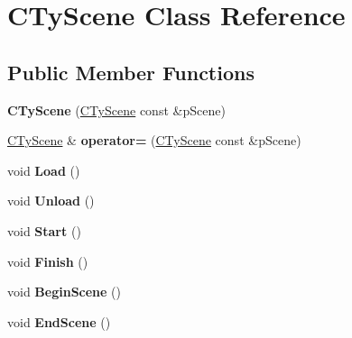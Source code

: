 \hypertarget{class_c_ty_scene}{
\section{CTyScene Class Reference}
\label{class_c_ty_scene}
}
\subsection*{Public Member Functions}
\begin{DoxyCompactItemize}
\item 
\hypertarget{class_c_ty_scene_a1e1d43a151e571a35af8b1fe141b2107}{
{\bfseries CTyScene} (\hyperlink{class_c_ty_scene}{CTyScene} const \&pScene)}
\label{class_c_ty_scene_a1e1d43a151e571a35af8b1fe141b2107}

\item 
\hypertarget{class_c_ty_scene_a7c8f9430dfe84184a2df808a8756421f}{
\hyperlink{class_c_ty_scene}{CTyScene} \& {\bfseries operator=} (\hyperlink{class_c_ty_scene}{CTyScene} const \&pScene)}
\label{class_c_ty_scene_a7c8f9430dfe84184a2df808a8756421f}

\item 
\hypertarget{class_c_ty_scene_a57748a3c188acc13f4c80b33eca95b76}{
void {\bfseries Load} ()}
\label{class_c_ty_scene_a57748a3c188acc13f4c80b33eca95b76}

\item 
\hypertarget{class_c_ty_scene_aa30fef255f74bbf9b9412303e58385ba}{
void {\bfseries Unload} ()}
\label{class_c_ty_scene_aa30fef255f74bbf9b9412303e58385ba}

\item 
\hypertarget{class_c_ty_scene_a0622e307b831fe46fc69f60382b94f31}{
void {\bfseries Start} ()}
\label{class_c_ty_scene_a0622e307b831fe46fc69f60382b94f31}

\item 
\hypertarget{class_c_ty_scene_a2e1e4b46d3f0203e5b60697fb8d52278}{
void {\bfseries Finish} ()}
\label{class_c_ty_scene_a2e1e4b46d3f0203e5b60697fb8d52278}

\item 
\hypertarget{class_c_ty_scene_a637569a7bedb42fdb0b412b908453931}{
void {\bfseries BeginScene} ()}
\label{class_c_ty_scene_a637569a7bedb42fdb0b412b908453931}

\item 
\hypertarget{class_c_ty_scene_af53da56827165b1f380a1f25c961d8be}{
void {\bfseries EndScene} ()}
\label{class_c_ty_scene_af53da56827165b1f380a1f25c961d8be}

\end{DoxyCompactItemize}
